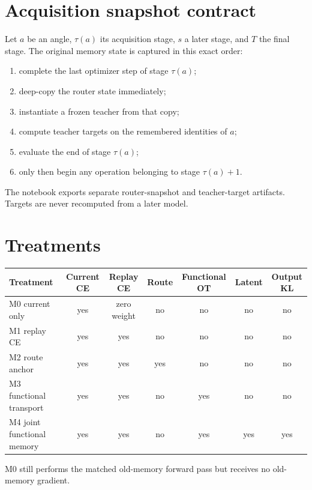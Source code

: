 \documentclass[11pt]{article}
\begin{document}
\section{Acquisition snapshot contract}
Let $a$ be an angle, $\tau(a)$ its acquisition stage, $s$ a later stage, and $T$ the final stage. The original memory state is captured in this exact order:
\begin{enumerate}
\item complete the last optimizer step of stage $\tau(a)$;
\item deep-copy the router state immediately;
\item instantiate a frozen teacher from that copy;
\item compute teacher targets on the remembered identities of $a$;
\item evaluate the end of stage $\tau(a)$;
\item only then begin any operation belonging to stage $\tau(a)+1$.
\end{enumerate}
The notebook exports separate router-snapshot and teacher-target artifacts. Targets are never recomputed from a later model.

\section{Treatments}
\begin{center}
\begin{tabular}{lcccccc}
\toprule
Treatment & Current CE & Replay CE & Route & Functional OT & Latent & Output KL\\
\midrule
M0 current only & yes & zero weight & no & no & no & no\\
M1 replay CE & yes & yes & no & no & no & no\\
M2 route anchor & yes & yes & yes & no & no & no\\
M3 functional transport & yes & yes & no & yes & no & no\\
M4 joint functional memory & yes & yes & no & yes & yes & yes\\
\bottomrule
\end{tabular}
\end{center}
M0 still performs the matched old-memory forward pass but receives no old-memory gradient.
\end{document}
